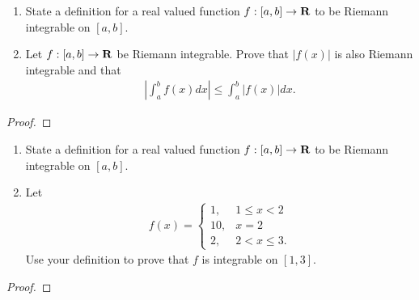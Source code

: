 \documentclass[11pt,twoside,openany]{memoir}
\begin{document}
\newpage
\fancyhead[L]{\scalebox{0.9}{Integration}}
\fancyhead[R]{\scalebox{0.9}{Appeared on: F22}}
\begin{problem}
    \phantom{a}
    \begin{enumerate}[label = (\arabic*)]
        \item State a definition for a real valued function $f:[a,b] \rightarrow \mathbf{R}$ to be Riemann integrable on $[a,b]$.
        \item Let $f:[a,b] \rightarrow \mathbf{R}$ be Riemann integrable. Prove that $|f(x)|$ is also Riemann integrable and that 
            \begin{equation*}
            \begin{split}
                \left| \int_a^b f(x) dx \right| \leq \int_a^b |f(x)|dx.
            \end{split}
            \end{equation*}
    \end{enumerate}
\end{problem}
\begin{proof}
\end{proof}

\newpage
\fancyhead[L]{\scalebox{0.9}{Integration}}
\fancyhead[R]{\scalebox{0.9}{Appeared on: W22}}
\begin{problem}
    \phantom{a}
    \begin{enumerate}[label = (\arabic*)]
        \item State a definition for a real valued function $f:[a,b] \rightarrow \mathbf{R}$ to be Riemann integrable on $[a,b]$.
        \item Let 
            \begin{equation*}
            \begin{split}
                f(x) =
                \begin{cases}
                    1, & 1 \leq x < 2 \\
                    10, & x = 2 \\
                    2, & 2 < x \leq 3.
                \end{cases}
            \end{split}
            \end{equation*}
        Use your definition to prove that $f$ is integrable on $[1,3]$.
    \end{enumerate}
\end{problem}
\begin{proof}
\end{proof}
\end{document}
